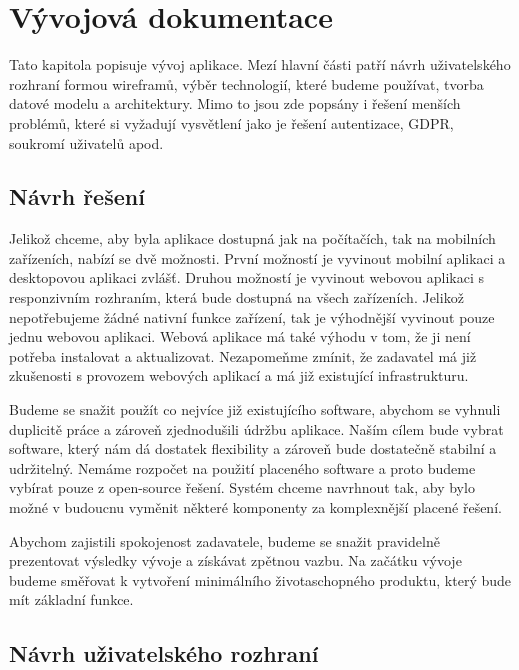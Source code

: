 \chapter{Vývojová dokumentace}\label{ch:vyvojova-dokumentace}

Tato kapitola popisuje vývoj aplikace.
Mezí hlavní části patří návrh uživatelského rozhraní formou wireframů, výběr technologií, které budeme používat, tvorba datové modelu a architektury.
Mimo to jsou zde popsány i řešení menších problémů, které si vyžadují vysvětlení jako je řešení autentizace, GDPR, soukromí uživatelů apod.

\section{Návrh řešení}\label{sec:navrh-reseni}

Jelikož chceme, aby byla aplikace dostupná jak na počítačích, tak na mobilních zařízeních, nabízí se dvě možnosti.
První možností je vyvinout mobilní aplikaci a desktopovou aplikaci zvlášť.
Druhou možností je vyvinout webovou aplikaci s responzivním rozhraním, která bude dostupná na všech zařízeních.
Jelikož nepotřebujeme žádné nativní funkce zařízení, tak je výhodnější vyvinout pouze jednu webovou aplikaci.
Webová aplikace má také výhodu v tom, že ji není potřeba instalovat a aktualizovat.
Nezapomeňme zmínit, že zadavatel má již zkušenosti s provozem webových aplikací a má již existující infrastrukturu.

Budeme se snažit použít co nejvíce již existujícího software, abychom se vyhnuli duplicitě práce a zároveň zjednodušili údržbu aplikace.
Naším cílem bude vybrat software, který nám dá dostatek flexibility a zároveň bude dostatečně stabilní a udržitelný.
Nemáme rozpočet na použití placeného software a proto budeme vybírat pouze z open-source řešení.
Systém chceme navrhnout tak, aby bylo možné v budoucnu vyměnit některé komponenty za komplexnější placené řešení.

Abychom zajistili spokojenost zadavatele, budeme se snažit pravidelně prezentovat výsledky vývoje a získávat zpětnou vazbu.
Na začátku vývoje budeme směřovat k vytvoření minimálního životaschopného produktu, který bude mít základní funkce.

\section{Návrh uživatelského rozhraní}\label{sec:navrh-uzivatelskeho-rozhrani}

